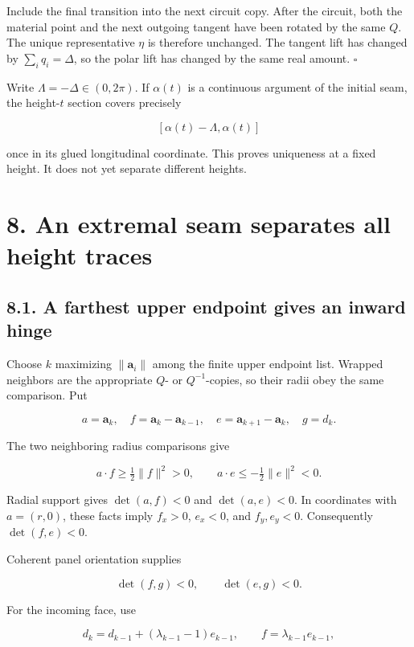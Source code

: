 \documentclass[
  11pt,
  letterpaper,
]{article}
\begin{document}
Include the final transition into the next circuit copy. After the
circuit, both the material point and the next outgoing tangent have been
rotated by the same \(Q\). The unique representative \(\eta\) is
therefore unchanged. The tangent lift has changed by
\(\sum_iq_i=\Delta\), so the polar lift has changed by the same real
amount. \(\square\)

Write \(\Lambda=-\Delta\in(0,2\pi)\). If \(\alpha(t)\) is a continuous
argument of the initial seam, the height-\(t\) section covers precisely

\[
[\alpha(t)-\Lambda,\alpha(t)]
\tag{7.4}
\]

once in its glued longitudinal coordinate. This proves uniqueness at a
fixed height. It does not yet separate different heights.

\section{8. An extremal seam separates all height
traces}\label{an-extremal-seam-separates-all-height-traces}

\subsection{8.1. A farthest upper endpoint gives an inward
hinge}\label{a-farthest-upper-endpoint-gives-an-inward-hinge}

Choose \(k\) maximizing \(\|\mathbf a_i\|\) among the finite upper
endpoint list. Wrapped neighbors are the appropriate \(Q\)- or
\(Q^{-1}\)-copies, so their radii obey the same comparison. Put

\[
a=\mathbf a_k,\quad
f=\mathbf a_k-\mathbf a_{k-1},\quad
e=\mathbf a_{k+1}-\mathbf a_k,\quad
g=d_k.
\]

The two neighboring radius comparisons give

\[
a\cdot f\ge\tfrac12\|f\|^2>0,
\qquad
a\cdot e\le-\tfrac12\|e\|^2<0.
\tag{8.1}
\]

Radial support gives \(\det(a,f)<0\) and \(\det(a,e)<0\). In coordinates
with \(a=(r,0)\), these facts imply \(f_x>0\), \(e_x<0\), and
\(f_y,e_y<0\). Consequently \(\det(f,e)<0\).

Coherent panel orientation supplies

\[
\det(f,g)<0,\qquad\det(e,g)<0.
\tag{8.2}
\]

For the incoming face, use

\[
d_k=d_{k-1}+(\lambda_{k-1}-1)e_{k-1},
\qquad f=\lambda_{k-1}e_{k-1},
\]
\end{document}
